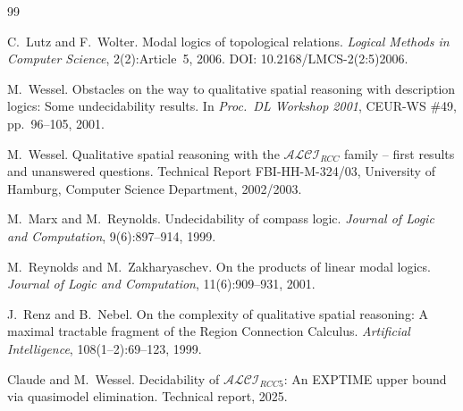 \documentclass[11pt]{article}
\begin{document}
\begin{thebibliography}{99}

C.~Lutz and F.~Wolter.
\newblock Modal logics of topological relations.
\newblock \emph{Logical Methods in Computer Science}, 2(2):Article~5, 2006.
\newblock DOI: 10.2168/LMCS-2(2:5)2006.

M.~Wessel.
\newblock Obstacles on the way to qualitative spatial reasoning with
  description logics: Some undecidability results.
\newblock In \emph{Proc.\ DL Workshop 2001}, CEUR-WS \#49, pp.~96--105, 2001.

M.~Wessel.
\newblock Qualitative spatial reasoning with the $\mathcal{ALCI}_{\mathit{RCC}}$
  family -- first results and unanswered questions.
\newblock Technical Report FBI-HH-M-324/03, University of Hamburg, Computer
  Science Department, 2002/2003.

M.~Marx and M.~Reynolds.
\newblock Undecidability of compass logic.
\newblock \emph{Journal of Logic and Computation}, 9(6):897--914, 1999.

M.~Reynolds and M.~Zakharyaschev.
\newblock On the products of linear modal logics.
\newblock \emph{Journal of Logic and Computation}, 11(6):909--931, 2001.

J.~Renz and B.~Nebel.
\newblock On the complexity of qualitative spatial reasoning: A maximal
  tractable fragment of the Region Connection Calculus.
\newblock \emph{Artificial Intelligence}, 108(1--2):69--123, 1999.

Claude and M.~Wessel.
\newblock Decidability of $\mathcal{ALCI}_{\mathit{RCC5}}$: An EXPTIME upper
  bound via quasimodel elimination.
\newblock Technical report, 2025.

\end{thebibliography}
\end{document}
